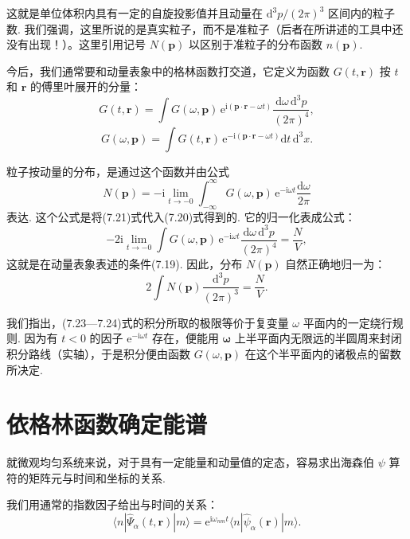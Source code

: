 这就是单位体积内具有一定的自旋投影值并且动量在 $\mathrm{d}^3p/(2\pi)^3$ 区间内的粒子数. 我们强调，这里所说的是真实粒子，而不是准粒子（后者在所讲述的工具中还没有出现！）。这里引用记号 $N(\bm p)$ 以区别于准粒子的分布函数 $n(\bm p)$.

今后，我们通常要和动量表象中的格林函数打交道，它定义为函数 $G(t,\bm r)$ 按 $t$ 和 $\bm r$ 的傅里叶展开的分量：
\begin{equation}
G(t,\bm r)=\int G(\omega,\bm p)\,\mathrm{e}^{\mathrm{i}(\bm p\cdot\bm r-\omega t)}\frac{\mathrm{d}\omega\,\mathrm{d}^3p}{(2\pi)^4},
\end{equation}
\begin{equation}
G(\omega,\bm p)=\int G(t,\bm r)\,\mathrm{e}^{-\mathrm{i}(\bm p\cdot\bm r-\omega t)}\mathrm{d}t\,\mathrm{d}^3x.
\end{equation}

粒子按动量的分布，是通过这个函数并由公式
\begin{equation}
N(\bm p)=-\mathrm{i}\lim_{t\to-0}\int_{-\infty}^{\infty}G(\omega,\bm p)\,\mathrm{e}^{-\mathrm{i}\omega t}\frac{\mathrm{d}\omega}{2\pi}
\end{equation}
表达. 这个公式是将(7.21)式代入(7.20)式得到的. 它的归一化表成公式：
\begin{equation}
-2\mathrm{i}\lim_{t\to-0}\int G(\omega,\bm p)\,\mathrm{e}^{-\mathrm{i}\omega t}\frac{\mathrm{d}\omega\,\mathrm{d}^3p}{(2\pi)^4}=\frac{N}{V},
\end{equation}
这就是在动量表象表述的条件(7.19). 因此，分布 $N(\bm p)$ 自然正确地归一为：
\begin{equation*}
2\int N(\bm p)\frac{\mathrm{d}^3p}{(2\pi)^3}=\frac{N}{V}.
\end{equation*}

我们指出，(7.23—7.24)式的积分所取的极限等价于复变量 $\omega$ 平面内的一定绕行规则. 因为有 $t<0$ 的因子 $\mathrm{e}^{-\mathrm{i}\omega t}$ 存在，便能用 $\bm\omega$ 上半平面内无限远的半圆周来封闭积分路线（实轴），于是积分便由函数 $G(\omega,\bm p)$ 在这个半平面内的诸极点的留数所决定.

\section{依格林函数确定能谱}

就微观均匀系统来说，对于具有一定能量和动量值的定态，容易求出海森伯 $\psi$ 算符的矩阵元与时间和坐标的关系.

我们用通常的指数因子给出与时间的关系：
\begin{equation}
\langle n|\hat\Psi_\alpha(t,\bm r)|m\rangle=\mathrm{e}^{\mathrm{i}\omega_{nm}t}\langle n|\hat\psi_\alpha(\bm r)|m\rangle.
\end{equation}

